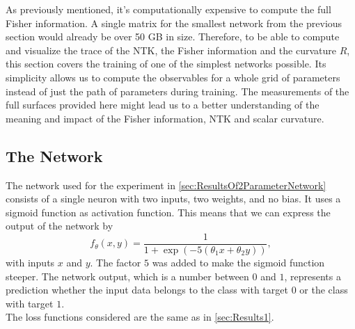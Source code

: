 As previously mentioned, it's computationally expensive to compute the full Fisher information. A single matrix for the smallest network from the previous section would already be over 50 GB in size. Therefore, to be able to compute and visualize the trace of the NTK, the Fisher information and the curvature $R$, this section covers the training of one of the simplest networks possible. Its simplicity allows us to compute the observables for a whole grid of parameters instead of just the path of parameters during training. The measurements of the full surfaces provided here might lead us to a better understanding of the meaning and impact of the Fisher information, NTK and scalar curvature.

\subsection{The Network}
The network used for the experiment in \cref{sec:ResultsOf2ParameterNetwork} consists of a single neuron with two inputs, two weights, and no bias. It uses a sigmoid function \cite{ActivationFunctionOverview} as activation function. This means that we can express the output of the network by 
\begin{equation}\label{eq:Results2Sigmoid}
	f_\theta(x,y) = \frac{1}{1+ \exp (-5(\theta_1 x + \theta_2 y))},
\end{equation}
with inputs $x$ and $y$. The factor $5$ was added to make the sigmoid function steeper. The network output, which is a number between $0$ and $1$, represents a prediction whether the input data belongs to the class with target $0$ or the class with target $1$.\\
The loss functions considered are the same as in \cref{sec:Results1}.

